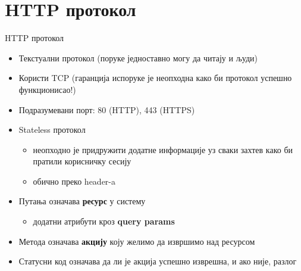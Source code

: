 \documentclass{beamer}
\begin{document}
    \section{HTTP протокол}
    
    \begin{frame}{HTTP протокол}
        \begin{itemize}
            \item Текстуални протокол (поруке једноставно могу да читају и људи)
            \item Користи TCP (гаранција испоруке је неопходна како би протокол успешно функционисао!)
            \item Подразумевани порт: 80 (HTTP), 443 (HTTPS)
            \item Stateless протокол
            \begin{itemize}
                \item неопходно је придружити додатне информације уз сваки захтев како би пратили корисничку сесију
                \item обично преко header-a
            \end{itemize}
            \item Путања означава \textbf{ресурс} у систему
            \begin{itemize}
                \item додатни атрибути кроз \textbf{query params}
            \end{itemize}
            \item Метода означава \textbf{акцију} коју желимо да извршимо над ресурсом
            \item Статусни код означава да ли је акција успешно изврешна, и ако није, разлог
        \end{itemize}
    \end{frame}
    
\end{document}

